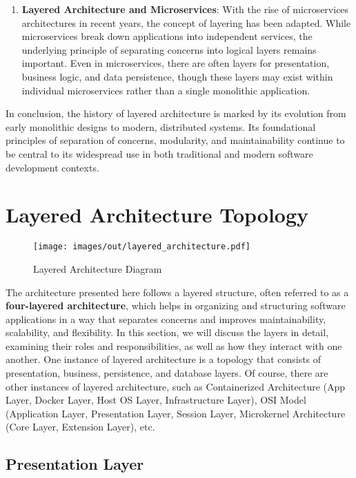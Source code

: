 \begin{enumerate}
	\item \textbf{Layered Architecture and Microservices}: 
	With the rise of microservices architectures in recent years, the concept of layering has been adapted. While microservices break down applications into independent services, the underlying principle of separating concerns into logical layers remains important. Even in microservices, there are often layers for presentation, business logic, and data persistence, though these layers may exist within individual microservices rather than a single monolithic application.
\end{enumerate}

In conclusion, the history of layered architecture is marked by its evolution from early monolithic designs to modern, distributed systems. Its foundational principles of separation of concerns, modularity, and maintainability continue to be central to its widespread use in both traditional and modern software development contexts.


\section{Layered Architecture Topology}

\begin{figure}[ht]
	\centering
	\texttt{[image: images/out/layered\_architecture.pdf]}
	\caption{Layered Architecture Diagram}
	\label{fig:layered_architecture}
\end{figure}

The architecture presented here follows a layered structure, often referred to as a \textbf{four-layered architecture}, which helps in organizing and structuring software applications in a way that separates concerns and improves maintainability, scalability, and flexibility. In this section, we will discuss the layers in detail, examining their roles and responsibilities, as well as how they interact with one another. One instance of layered architecture is a topology that consists of presentation, business, persistence, and database layers. Of course, there are other instances of layered architecture, such as Containerized Architecture (App Layer, Docker Layer, Host OS Layer, Infrastructure Layer), OSI Model (Application Layer, Presentation Layer, Session Layer, Microkernel Architecture (Core Layer, Extension Layer), etc.

\subsection{Presentation Layer}

